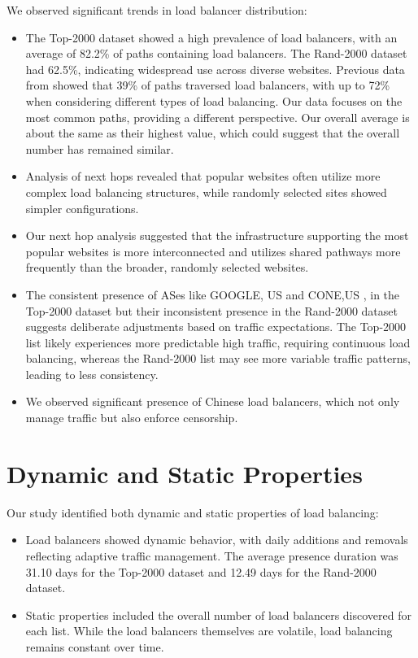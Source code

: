 \documentclass[12pt]{cwru_thesis}
\begin{document}
We observed significant trends in load balancer distribution:
\begin{itemize}
    \item The Top-2000 dataset showed a high prevalence of load balancers, with an average of 82.2\% of paths containing load balancers. The Rand-2000 dataset had 62.5\%, indicating widespread use across diverse websites. Previous data from  \cite{augustin2010measuring} showed that 39\% of paths traversed load balancers, with up to 72\% when considering different types of load balancing. Our data focuses on the most common paths, providing a different perspective. Our overall average is about the same as their highest value, which could suggest that the overall number has remained similar.
    \item Analysis of next hops revealed that popular websites often utilize more complex load balancing structures, while randomly selected sites showed simpler configurations.
    \item Our next hop analysis suggested that the infrastructure supporting the most popular websites is more interconnected and utilizes shared pathways more frequently than the broader, randomly selected websites.
    \item The consistent presence of ASes like GOOGLE, US and CONE,US , in the Top-2000 dataset but their inconsistent presence in the Rand-2000 dataset suggests deliberate adjustments based on traffic expectations. The Top-2000 list likely experiences more predictable high traffic, requiring continuous load balancing, whereas the Rand-2000 list may see more variable traffic patterns, leading to less consistency.
    \item We observed significant presence of Chinese load balancers, which not only manage traffic but also enforce censorship.
\end{itemize}

\section*{Dynamic and Static Properties}

Our study identified both dynamic and static properties of load balancing:
\begin{itemize}
    \item Load balancers showed dynamic behavior, with daily additions and removals reflecting adaptive traffic management. The average presence duration was 31.10 days for the Top-2000 dataset and 12.49 days for the Rand-2000 dataset.
    \item Static properties included the overall number of load balancers discovered for each list. While the load balancers themselves are volatile, load balancing remains constant over time.
    
\end{itemize}
\end{document}

